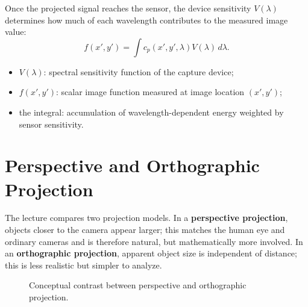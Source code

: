 \documentclass[11pt,a4paper,oneside]{report}
\newcommand{\mathlegend}[1]{%
  \par\vspace{0.2em}{\small\itshape where}\par
  \begin{itemize}[leftmargin=1.7em,topsep=0.15em,itemsep=0.12em]
  #1
  \end{itemize}
}
\begin{document}
Once the projected signal reaches the sensor, the device sensitivity $V(\lambda)$ determines how much of each wavelength contributes to the measured image value:
\begin{equation}
  f(x',y')=\int c_p(x',y',\lambda)V(\lambda)\,d\lambda.
  \label{eq:sensor-integration}
\end{equation}
\mathlegend{
  \item $V(\lambda)$: spectral sensitivity function of the capture device;
  \item $f(x',y')$: scalar image function measured at image location $(x',y')$;
  \item the integral: accumulation of wavelength-dependent energy weighted by sensor sensitivity.
}

\section{Perspective and Orthographic Projection}

The lecture compares two projection models. In a \textbf{perspective projection}, objects closer to the camera appear larger; this matches the human eye and ordinary cameras and is therefore natural, but mathematically more involved. In an \textbf{orthographic projection}, apparent object size is independent of distance; this is less realistic but simpler to analyze.

\begin{figure}[H]
\centering
{}
\caption{Conceptual contrast between perspective and orthographic projection.}
\label{fig:projection-types}
\end{figure}
\end{document}
